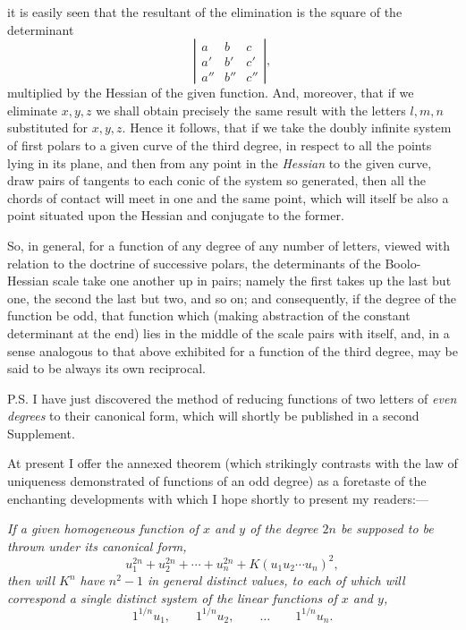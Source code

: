 \documentclass[11pt]{article}
\newcommand{\sourcepage}[1]{\marginpar{\scriptsize p.~#1}}
\begin{document}
{{\sourcepage{216}
it is easily seen that the resultant of the elimination is the square of the determinant
\[
 \left|
 \begin{array}{ccc}
 a&b&c\\
 a'&b'&c'\\
 a''&b''&c''
 \end{array}
 \right|,
\]
multiplied by the Hessian of the given function. And, moreover, that if we eliminate $x,y,z$ we shall obtain precisely the same result with the letters $l,m,n$ substituted for $x,y,z$. Hence it follows, that if we take the doubly infinite system of first polars to a given curve of the third degree, in respect to all the points lying in its plane, and then from any point in the \emph{Hessian} to the given curve, draw pairs of tangents to each conic of the system so generated, then all the chords of contact will meet in one and the same point, which will itself be also a point situated upon the Hessian and conjugate to the former.

So, in general, for a function of any degree of any number of letters, viewed with relation to the doctrine of successive polars, the determinants of the Boolo-Hessian scale take one another up in pairs; namely the first takes up the last but one, the second the last but two, and so on; and consequently, if the degree of the function be odd, that function which (making abstraction of the constant determinant at the end) lies in the middle of the scale pairs with itself, and, in a sense analogous to that above exhibited for a function of the third degree, may be said to be always its own reciprocal.

P.S. I have just discovered the method of reducing functions of two letters of \emph{even degrees} to their canonical form, which will shortly be published in a second Supplement.

At present I offer the annexed theorem (which strikingly contrasts with the law of uniqueness demonstrated of functions of an odd degree) as a foretaste of the enchanting developments with which I hope shortly to present my readers:---

\emph{If a given homogeneous function of $x$ and $y$ of the degree $2n$ be supposed to be thrown under its canonical form,}
\[
 u_1^{2n}+u_2^{2n}+\cdots+u_n^{2n}+K(u_1u_2\cdots u_n)^2,
\]
\emph{then will $K^n$ have $n^2-1$ in general distinct values, to each of which will correspond a single distinct system of the linear functions of $x$ and $y$,}
\[
 1^{1/n}u_1,\qquad 1^{1/n}u_2,\qquad \ldots\qquad 1^{1/n}u_n.
\]

}}
\end{document}
